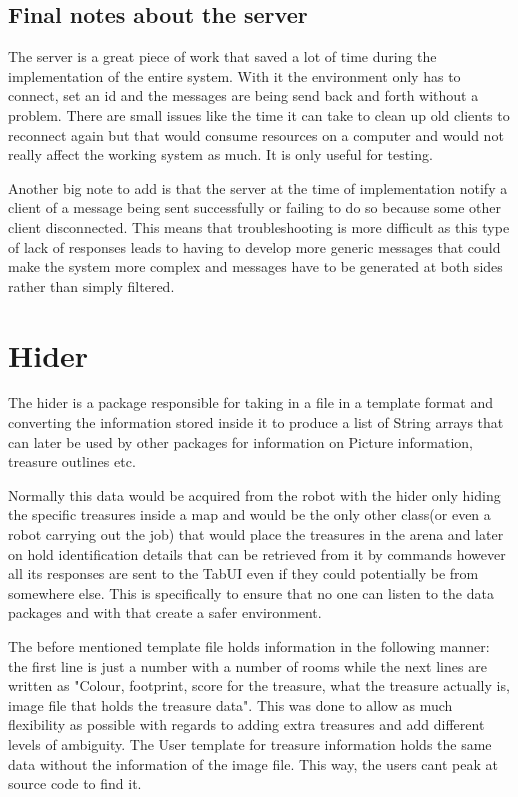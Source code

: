     \subsection{Final notes about the server}
      The server is a great piece of work that saved a lot of time during the implementation of the entire system. With it the environment only has to connect, set an id and the messages are being send back and forth without a problem. There are small issues like the time it can take to clean up old clients to reconnect again but that would consume resources on a computer and would not really affect the working system as much. It is only useful for testing.

      Another big note to add is that the server at the time of implementation notify a client of a message being sent successfully or failing to do so because some other client disconnected. This means that troubleshooting is more difficult as this type of lack of responses leads to having to develop more generic messages that could make the system more complex and messages have to be generated at both sides rather than simply filtered.

  \section{Hider}
    The hider is a package responsible for taking in a file in a template format and converting the information stored inside it to produce a list of String arrays that can later be used by other packages for information on Picture information, treasure outlines etc.

    Normally this data would be acquired from the robot with the hider only hiding the specific treasures inside a map and would be the only other class(or even a robot carrying out the job) that would place the treasures in the arena and later on hold identification details that can be retrieved from it by commands however all its responses are sent to the TabUI even if they could potentially be from somewhere else. This is specifically to ensure that no one can listen to the data packages and with that create a safer environment.

    The before mentioned template file holds information in the following manner: the first line is just a number with a number of rooms while the next lines are written as "Colour, footprint, score for the treasure, what the treasure actually is, image file that holds the treasure data". This was done to allow as much flexibility as possible with regards to adding extra treasures and add different levels of ambiguity. The User template for treasure information holds the same data without the information of the image file. This way, the users cant peak at source code to find it.


